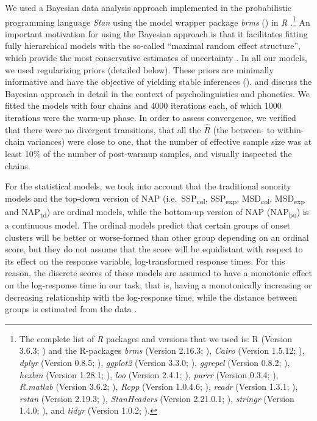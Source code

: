 We used a Bayesian data analysis approach implemented in the probabilistic programming language \emph{Stan} \citep{Stan2018} using the model wrapper package \emph{brms} (\citealt{R-brms_a, R-brms_b}) in \emph{R} \citep{R-base}.\footnote{The complete list of \emph{R} packages and versions that we used is: R (Version 3.6.3; \citealt{R-base}) and the R-packages \emph{brms} (Version 2.16.3; \citealt{R-brms_a, R-brms_b}), \emph{Cairo} (Version 1.5.12; \citealt{R-Cairo}), \emph{dplyr} (Version 0.8.5; \citealt{R-dplyr}), \emph{ggplot2} (Version 3.3.0; \citealt{R-ggplot2}), \emph{ggrepel} (Version 0.8.2; \citealt{R-ggrepel}), \emph{hexbin} (Version 1.28.1; \citealt{R-hexbin}), \emph{loo} (Version 2.4.1; \citealt{R-loo_b}), \emph{purrr} (Version 0.3.4; \citealt{R-purrr}), \emph{R.matlab} (Version 3.6.2; \citealt{R-R.matlab}), \emph{Rcpp} (Version 1.0.4.6; \citealt{R-Rcpp_a, R-Rcpp_b}), \emph{readr} (Version 1.3.1; \citealt{R-readr}), \emph{rstan} (Version 2.19.3; \citealt{R-rstan}), \emph{StanHeaders} (Version 2.21.0.1; \citealt{R-StanHeaders}), \emph{stringr} (Version 1.4.0; \citealt{R-stringr}), and \emph{tidyr} (Version 1.0.2; \citealt{R-tidyr}).} An important motivation for using the Bayesian approach is that it facilitates fitting fully hierarchical models with the so-called \enquote{maximal random effect structure}, which provide the most conservative estimates of uncertainty \citep{SchielzethForstmeier2009}. In all our models, we used regularizing priors (detailed below). These priors are minimally informative and have the objective of yielding stable inferences (\citealt{chung2013weakly, gelman2008weakly, GelmanEtAl2017}). \citet{NicenboimVasishth2016} and \citet{VasishthEtAl2017EDAPS} discuss the Bayesian approach in detail in the context of psycholinguistics and phonetics. We fitted the models with four chains and 4000 iterations each, of which 1000 iterations were the warm-up phase. In order to assess convergence, we verified that there were no divergent transitions, that all the \(\hat{R}\) (the between- to within-chain variances) were close to one, that the number of effective sample size was at least 10\% of the number of post-warmup samples, and visually inspected the chains.

For the statistical models, we took into account that the traditional sonority models and the top-down version of NAP (i.e.~SSP\textsubscript{col}, SSP\textsubscript{exp}, MSD\textsubscript{col}, MSD\textsubscript{exp} and NAP\textsubscript{td}) are ordinal models, while the bottom-up version of NAP (NAP\textsubscript{bu}) is a continuous model. The ordinal models predict that certain groups of onset clusters will be better or worse-formed than other group depending on an ordinal score, but they do not assume that the score will be equidistant with respect to its effect on the response variable, log-transformed response times. For this reason, the discrete scores of these models are assumed to have a monotonic effect on the log-response time in our task, that is, having a monotonically increasing or decreasing relationship with the log-response time, while the distance between groups is estimated from the data \citep{burknerModelingMonotonicEffects2018}.

